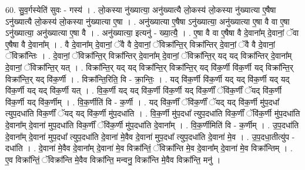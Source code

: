 \documentclass[17pt]{extarticle}
\begin{document}
60. सु॒व॒र्गस्येति॑ सुवः - गस्य॑ । . लो॒कस्या नु॑ख्यात्या॒ अनु॑ख्यात्यै लो॒कस्य॑ लो॒कस्या नु॑ख्यात्या ए॒षैषा ऽनु॑ख्यात्यै लो॒कस्य॑ लो॒कस्या नु॑ख्यात्या ए॒षा । . अनु॑ख्यात्या ए॒षैषा ऽनु॑ख्यात्या॒ अनु॑ख्यात्या ए॒षा वै वा ए॒षा ऽनु॑ख्यात्या॒ अनु॑ख्यात्या ए॒षा वै । . अनु॑ख्यात्या॒ इत्यनु॑ - ख्या॒त्यै॒ । . ए॒षा वै वा ए॒षैषा वै दे॒वाना᳚म् दे॒वानां॒ ॅवा ए॒षैषा वै दे॒वाना᳚म् । . वै दे॒वाना᳚म् दे॒वानां॒ ॅवै वै दे॒वानां॒ ॅविक्रा᳚न्ति॒र् विक्रा᳚न्तिर् दे॒वानां॒ ॅवै वै दे॒वानां॒ ॅविक्रा᳚न्तिः । . दे॒वानां॒ ॅविक्रा᳚न्ति॒र् विक्रा᳚न्तिर् दे॒वाना᳚म् दे॒वानां॒ ॅविक्रा᳚न्ति॒र् यद् यद् विक्रा᳚न्तिर् दे॒वाना᳚म् दे॒वानां॒ ॅविक्रा᳚न्ति॒र् यत् । . विक्रा᳚न्ति॒र् यद् यद् विक्रा᳚न्ति॒र् विक्रा᳚न्ति॒र् यद् वि॑क॒र्णी वि॑क॒र्णी यद् विक्रा᳚न्ति॒र् विक्रा᳚न्ति॒र् यद् वि॑क॒र्णी । . विक्रा᳚न्ति॒रिति॒ वि - क्रा॒न्तिः॒ । . यद् वि॑क॒र्णी वि॑क॒र्णी यद् यद् वि॑क॒र्णी यद् यद् वि॑क॒र्णी यद् यद् वि॑क॒र्णी यत् । . वि॒क॒र्णी यद् यद् वि॑क॒र्णी वि॑क॒र्णी यद् वि॑क॒र्णीं ॅवि॑क॒र्णीं ॅयद् वि॑क॒र्णी वि॑क॒र्णी यद् वि॑क॒र्णीम् । . वि॒क॒र्णीति॑ वि - क॒र्णी । . यद् वि॑क॒र्णीं ॅवि॑क॒र्णीं ॅयद् यद् वि॑क॒र्णी मु॑प॒दधा᳚ त्युप॒दधा॑ति विक॒र्णीं ॅयद् यद् वि॑क॒र्णी मु॑प॒दधा॑ति । . वि॒क॒र्णी मु॑प॒दधा᳚ त्युप॒दधा॑ति विक॒र्णीं ॅवि॑क॒र्णी मु॑प॒दधा॑ति दे॒वाना᳚म् दे॒वाना॑ मुप॒दधा॑ति विक॒र्णीं ॅवि॑क॒र्णी मु॑प॒दधा॑ति दे॒वाना᳚म् । . वि॒क॒र्णीमिति॑ वि - क॒र्णीम् । . उ॒प॒दधा॑ति दे॒वाना᳚म् दे॒वाना॑ मुप॒दधा᳚ त्युप॒दधा॑ति दे॒वाना॑ मे॒वैव दे॒वाना॑ मुप॒दधा᳚ त्युप॒दधा॑ति दे॒वाना॑ मे॒व । . उ॒प॒दधा॒तीत्यु॑प - दधा॑ति । . दे॒वाना॑ मे॒वैव दे॒वाना᳚म् दे॒वाना॑ मे॒व विक्रा᳚न्तिं॒ ॅविक्रा᳚न्ति मे॒व दे॒वाना᳚म् दे॒वाना॑ मे॒व विक्रा᳚न्तिम् । . ए॒व विक्रा᳚न्तिं॒ ॅविक्रा᳚न्ति मे॒वैव विक्रा᳚न्ति॒ मन्वनु॒ विक्रा᳚न्ति मे॒वैव विक्रा᳚न्ति॒ मनु॑ । \newline
\end{document}
